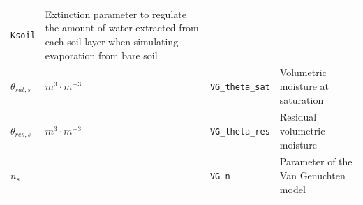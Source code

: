 \documentclass[]{book}
\begin{document}
\begin{longtable}[]{@{}llll@{}}
\begin{minipage}[t]{0.06\columnwidth}
\texttt{Ksoil}\strut
\end{minipage} & \begin{minipage}[t]{0.53\columnwidth}\raggedright\strut
Extinction parameter to regulate the amount of water extracted from each
soil layer when simulating evaporation from bare soil\strut
\end{minipage}\tabularnewline
\begin{minipage}[t]{0.11\columnwidth}\raggedright\strut
\(\theta_{sat, s}\)\strut
\end{minipage} & \begin{minipage}[t]{0.10\columnwidth}\raggedright\strut
\(m^3 \cdot m^{-3}\)\strut
\end{minipage} & \begin{minipage}[t]{0.06\columnwidth}\raggedright\strut
\texttt{VG\_theta\_sat}\strut
\end{minipage} & \begin{minipage}[t]{0.53\columnwidth}\raggedright\strut
Volumetric moisture at saturation\strut
\end{minipage}\tabularnewline
\begin{minipage}[t]{0.11\columnwidth}\raggedright\strut
\(\theta_{res, s}\)\strut
\end{minipage} & \begin{minipage}[t]{0.10\columnwidth}\raggedright\strut
\(m^3 \cdot m^{-3}\)\strut
\end{minipage} & \begin{minipage}[t]{0.06\columnwidth}\raggedright\strut
\texttt{VG\_theta\_res}\strut
\end{minipage} & \begin{minipage}[t]{0.53\columnwidth}\raggedright\strut
Residual volumetric moisture\strut
\end{minipage}\tabularnewline
\begin{minipage}[t]{0.11\columnwidth}\raggedright\strut
\(n_s\)\strut
\end{minipage} & \begin{minipage}[t]{0.10\columnwidth}\raggedright\strut
\strut
\end{minipage} & \begin{minipage}[t]{0.06\columnwidth}\raggedright\strut
\texttt{VG\_n}\strut
\end{minipage} & \begin{minipage}[t]{0.53\columnwidth}\raggedright\strut
Parameter of the Van Genuchten \citeyearpar{Genuchten1980} model\strut
\end{minipage}\tabularnewline

\end{longtable}
\end{document}
